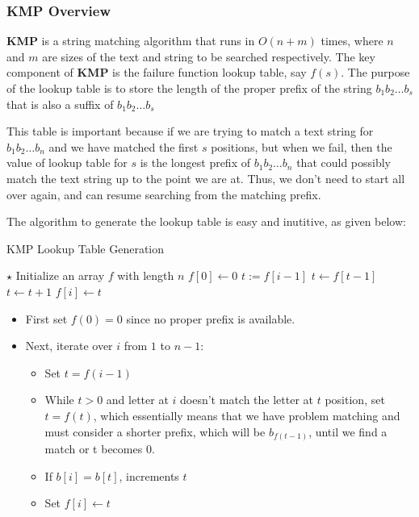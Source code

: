 \subsubsection{KMP Overview}
\textbf{KMP} is a string matching algorithm that runs in $O(n+m)$ times, where $n$ and $m$ are sizes of the text and string to be searched respectively. The key component of \textbf{KMP} is the failure function lookup table, say $f(s)$. The purpose of the lookup table is to store the length of the proper prefix of the string $b_{1}b_{2}\ldots b_{s}$ that is also a suffix of $b_{1}b_{2}\ldots b_{s}$
\par
This table is important because if we are trying to match a text string for $b_{1}b_{2}\ldots b_{n}$ and we have matched the first $s$ positions, but when we fail, then the value of lookup table for $s$ is the longest prefix of $b_{1}b_{2}\ldots b_{n}$ that could possibly match the text string up to the point we are at. Thus, we don't need to start all over again, and can resume searching from the matching prefix.
\par
The algorithm to generate the lookup table is easy and inutitive, as given below:
\setcounter{algorithm}{0}
\begin{algorithm}[H]
\caption{KMP Lookup Table Generation}
\begin{algorithmic}[1]
\State $\star$ Initialize an array $f$ with length $n$
\State $f[0]\gets 0$
\State $t:=f[i-1]$
\State $t\gets f[t-1]$
\EndWhile
{}
\State $t\gets t+1$
\EndIf
\State $f[i]\gets t$
\EndFor
\EndProcedure
\end{algorithmic}
\end{algorithm}
\begin{itemize}
\item First set $f(0)=0$ since no proper prefix is available.
\item Next, iterate over $i$ from $1$ to $n-1$:
\begin{itemize}
\item Set $t=f(i-1)$
\item While $t>0$ and letter at $i$ doesn't match the letter at $t$ position, set $t=f(t)$, which essentially means that we have problem matching and must consider a shorter prefix, which will be $b_{f(t-1)}$, until we find a match or t becomes 0.
\item If $b[i]=b[t]$, increments $t$ 
\item Set $f[i]\gets t$
\end{itemize}
\end{itemize}
